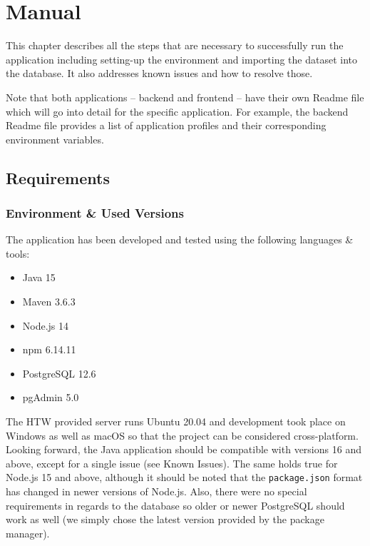 \chapter{Manual}
\label{ch:Manual}

This chapter describes all the steps that are necessary to successfully run the application including setting-up the environment and importing the dataset into the database. It also addresses known issues and how to resolve those.

Note that both applications -- backend and frontend -- have their own Readme file which will go into detail for the specific application. For example, the backend Readme file provides a list of application profiles and their corresponding environment variables.

\section{Requirements}

\subsection{Environment \& Used Versions}

The application has been developed and tested using the following languages \& tools:

\begin{itemize}
    \item Java 15
    \item Maven 3.6.3
    \item Node.js 14
    \item npm 6.14.11
    \item PostgreSQL 12.6
    \item pgAdmin 5.0
\end{itemize}

The HTW provided server runs Ubuntu 20.04 and development took place on Windows as well as macOS so that the project can be considered cross-platform. Looking forward, the Java application should be compatible with versions 16 and above, except for a single issue (see Known Issues). The same holds true for Node.js 15 and above, although it should be noted that the \texttt{package.json} format has changed in newer versions of Node.js. Also, there were no special requirements in regards to the database so older or newer PostgreSQL should work as well (we simply chose the latest version provided by the package manager).

